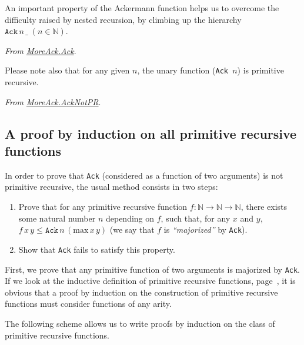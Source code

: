 An important property of the Ackermann function helps us 
to overcome the difficulty raised by nested recursion, by climbing up the hierarchy $\texttt{Ack}\,n\,\_\;(n\in\mathbb{N})$.


\noindent
\emph{From \href{../theories/html/hydras.MoreAck.Ack.html}{MoreAck.Ack}}.





Please note also that for any given $n$, the unary function
(\texttt{Ack\,$n$}) is primitive recursive.

\vspace{4pt}

\noindent

\emph{From \href{../theories/html/hydras.MoreAck.AckNotPR.html}{MoreAck.AckNotPR}}.







\subsection{A proof by induction on all primitive recursive functions}

In order to prove that \texttt{Ack} (considered as a function of two arguments) is not primitive recursive, the usual method consists in two steps:


\begin{enumerate}
\item Prove that for any primitive recursive function $f:\mathbb{N}\rightarrow\mathbb{N}\rightarrow\mathbb{N}$, there exists some natural number $n$ depending on $f$, such that, for any $x$ and $y$, 
$f\,x\,y \leq \texttt{Ack}\,n\,(\textrm{max}\,x\,y)$ (we say that $f$ is \emph{``majorized''}  by \texttt{Ack}).
\item Show that \texttt{Ack} fails to satisfy this property.
\end{enumerate}

First, we prove that any primitive function of two arguments is majorized by \texttt{Ack}.
If we look at the inductive definition of primitive recursive functions, page~\pageref{def:Primrec}, it is obvious that a proof by induction on the construction of primitive recursive functions must consider functions of any arity.

The following scheme allows us to write proofs by induction on the class of primitive recursive functions. 

